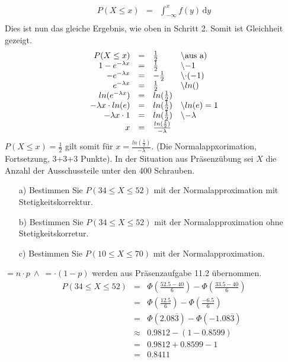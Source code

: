 \documentclass[twoside]{article}
\begin{document}
    \begin{equation*}
        \begin{array}{rll}
            P(X \leq x)&=&\int_{-\infty}^{x} \! f(y) \, \mathrm{d}y\\
        \end{array}
    \end{equation*}
    Dies ist nun das gleiche Ergebnis, wie oben in Schritt 2.
    Somit ist Gleichheit gezeigt.
\sss
    \begin{equation*}
        \begin{array}{rlll}
            P(X \leq x)&=&\frac{1}{2}&$\textbackslash aus a)$\\
            1-e^{-\lambda x}&=&\frac{1}{2}&$\textbackslash $-1\\
            -e^{-\lambda x}&=&-\frac{1}{2}&$\textbackslash $\cdot(-1)\\
            e^{-\lambda x}&=&\frac{1}{2}&$\textbackslash $ln()\\
            ln(e^{-\lambda x})&=&ln(\frac{1}{2})&\\
            -\lambda x\cdot ln(e)&=&ln(\frac{1}{2})&$\textbackslash $ln(e) = 1\\
            -\lambda x\cdot 1&=&ln(\frac{1}{2})&$\textbackslash $-\lambda\\
            x&=&\frac{ln(\frac{1}{2})}{-\lambda}&
        \end{array}
    \end{equation*}
    $P(X \leq x) = \frac{1}{2}$ gilt somit für $x=\frac{ln(\frac{1}{2})}{-\lambda}$.
(Die Normalappxorimation, Fortsetzung, 3+3+3 Punkte).
In der Situation aus Präsenzübung sei $X$ die Anzahl der Ausschussteile unter den 400 Schrauben.
\begin{enumerate}
	\item[a)] Bestimmen Sie $P(34 \leq X \leq 52)$ mit der Normalapproximation mit Stetigkeitskorrektur.
	\item[b)] Bestimmen Sie $P(34 \leq X \leq 52)$ mit der Normalapproximation ohne Stetigkeitskorretur.
	\item[c)] Bestimmen Sie $P(10 \leq X \leq 70)$ mit der Normalapproximation.
\end{enumerate}
\sss
    $=n\cdot p ~\land~$$=$$\cdot (1-p)$ werden aus Präsenzaufgabe 11.2 übernommen.
    \begin{equation*}
        \begin{array}{rll}
            P(34 \leq X\leq 52)&=&\Phi\left(\frac{52.5-40}{6}\right)-\Phi\left(\frac{33.5-40}{6}\right)\\
            &=&\Phi\left(\frac{12.5}{6}\right)-\Phi\left(\frac{-6.5}{6}\right)\\
            &=&\Phi(2.08\overline{3})-\Phi(-1.08\overline{3})\\
            &\approx&0.9812-(1-0.8599)\\
            &=&0.9812+0.8599-1\\
            &=&0.8411
        \end{array}
    \end{equation*}
\end{document}
